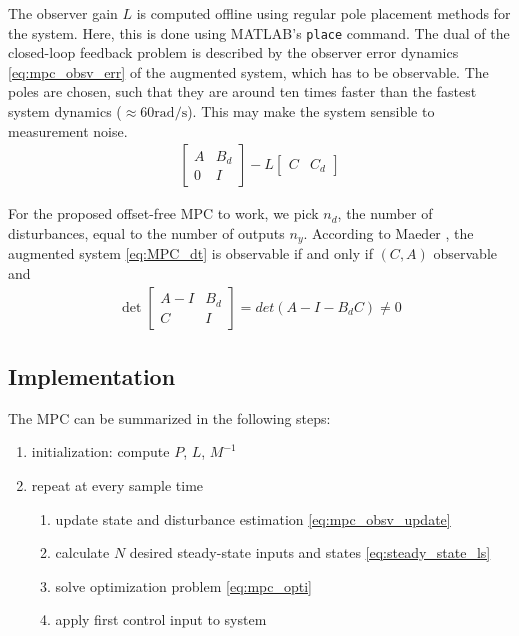 The observer gain $L$ is computed offline using regular pole placement methods for the system. Here, this is done using MATLAB's \texttt{place} command. The dual of the closed-loop feedback problem is described by the observer error dynamics \ref{eq:mpc_obsv_err} of the augmented system, which has to be observable. The poles are chosen, such that they are around ten times faster than the fastest system dynamics ($\approx 60\si{\radian\per\second}$). This may make the system sensible to measurement noise. 
\begin{align}
\begin{bmatrix}
A & B_d \\
0 & I
\end{bmatrix}
- L
\begin{bmatrix}
C & C_d
\end{bmatrix} \label{eq:mpc_obsv_err}
\end{align}

For the proposed offset-free MPC to work, we pick $n_d$, the number of disturbances, equal to the number of outputs $n_y$. According to Maeder \cite{Maeder2009}, the augmented system \ref{eq:MPC_dt} is observable if and only if $(C,A)$ observable and
\begin{align}
\det \begin{bmatrix}
A-I & B_d \\ C & I 
\end{bmatrix} = det(A-I-B_dC) \neq 0 \label{eq:mpc_obsv_cond}
\end{align}

\subsection{Implementation}
The MPC can be summarized in the following steps:
\begin{enumerate}
\item initialization: compute $P$, $L$, $M^{-1}$
\item repeat at every sample time
\begin{enumerate}
\item update state and disturbance estimation \ref{eq:mpc_obsv_update} \label{enum:mpc_start}
\item calculate $N$ desired steady-state inputs and states \ref{eq:steady_state_ls}
\item solve optimization problem \ref{eq:mpc_opti}
\item apply first control input to system \label{enum:mpc_finish}
\end{enumerate}
\end{enumerate}

